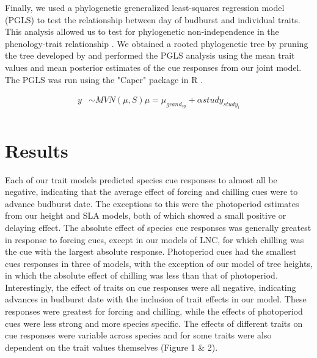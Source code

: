 \documentclass{article}\usepackage[]{graphicx}\usepackage[]{color}
\begin{document}

Finally, we used a phylogenetic greneralized least-squares regression model (PGLS) to test the relationship between day of budburst and individual traits. This analysis allowed us to test for phylogenetic non-independence in the phenology-trait relationship \citep{Freckleton2002}. We obtained a rooted phylogenetic tree by pruning the tree developed by \citep{Smith2018} and performed the PGLS analysis using the mean trait values and mean posterior estimates of the cue responses from our joint model. The PGLS was run using the "Caper" package in R \citep{Orne2013}.


\begin{align*}
y & \sim MVN(\mu, S)
\mu = \mu_{grand_{sp}} + \alpha study_{study_i} \\
\end{align*}

\section{Results}

Each of our trait models predicted species cue responses to almost all be negative, indicating that the average effect of forcing and chilling cues were to advance budburst date. The exceptions to this were the photoperiod estimates from our height and SLA models, both of which showed a small positive or delaying effect. The absolute effect of species cue responses was generally greatest in response to forcing cues, except in our models of LNC, for which chilling was the cue with the largest absolute response. Photoperiod cues had the smallest cues responses in three of models, with the exception of our model of tree heights, in which the absolute effect of chilling was less than that of photoperiod. Interestingly, the effect of traits on cue responses were all negative, indicating advances in budburst date with the inclusion of trait effects in our model. These responses were greatest for forcing and chilling, while the effects of photoperiod cues were less strong and more species specific. The effects of different traits on cue responses were variable across species and for some traits were also dependent on the trait values themselves (Figure 1 \& 2).
\end{document}
